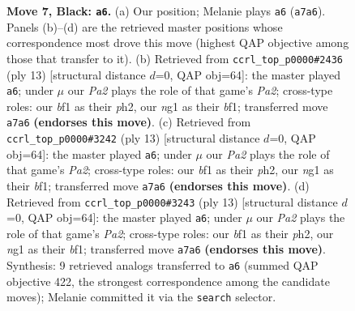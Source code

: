 \documentclass[11pt]{article}
\begin{document}
\begin{figure}[p]
\caption{\textbf{Move 7, Black: \texttt{a6}.} (a) Our position; Melanie plays \texttt{a6} (\texttt{a7a6}). Panels (b)--(d) are the retrieved master positions whose correspondence most drove this move (highest QAP objective among those that transfer to it). (b) Retrieved from \texttt{ccrl\_top\_p0000\#2436} (ply 13) [structural distance $d$=0, QAP obj=64]: the master played \texttt{a6}; under $\mu$ our \emph{Pa2} plays the role of that game's \emph{Pa2}; cross-type roles: our \emph{b}f1 as their \emph{p}h2, our \emph{n}g1 as their \emph{b}f1; transferred move \texttt{a7a6} \textbf{(endorses this move)}. (c) Retrieved from \texttt{ccrl\_top\_p0000\#3242} (ply 13) [structural distance $d$=0, QAP obj=64]: the master played \texttt{a6}; under $\mu$ our \emph{Pa2} plays the role of that game's \emph{Pa2}; cross-type roles: our \emph{b}f1 as their \emph{p}h2, our \emph{n}g1 as their \emph{b}f1; transferred move \texttt{a7a6} \textbf{(endorses this move)}. (d) Retrieved from \texttt{ccrl\_top\_p0000\#3243} (ply 13) [structural distance $d$=0, QAP obj=64]: the master played \texttt{a6}; under $\mu$ our \emph{Pa2} plays the role of that game's \emph{Pa2}; cross-type roles: our \emph{b}f1 as their \emph{p}h2, our \emph{n}g1 as their \emph{b}f1; transferred move \texttt{a7a6} \textbf{(endorses this move)}. Synthesis: 9 retrieved analogs transferred to \texttt{a6} (summed QAP objective 422, the strongest correspondence among the candidate moves); Melanie committed it via the \texttt{search} selector.}
\label{fig:thought-m13}
\end{figure}

\clearpage
\end{document}
